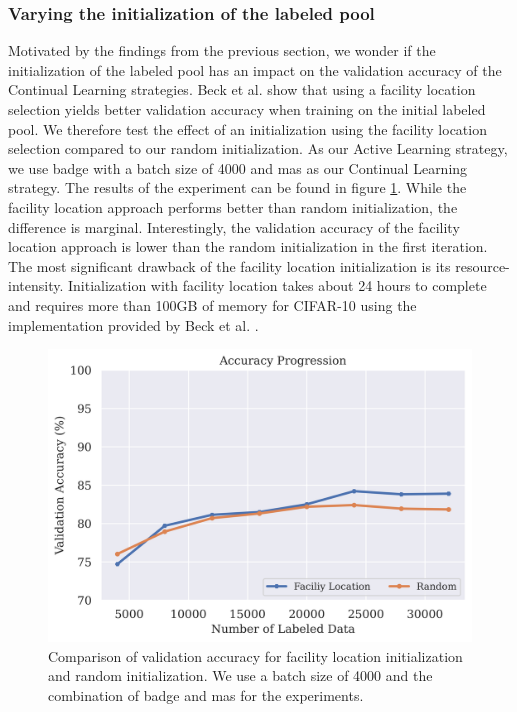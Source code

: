 \subsubsection{Varying the initialization of the labeled pool}
\label{sec:Evaluation:Results:CAL:Initialization}
Motivated by the findings from the previous section, we wonder if the initialization of the labeled pool has an impact on the validation accuracy of the Continual Learning strategies. Beck et al.\cite{beck2021effective} show that using a facility location selection 
\cite{iyer2021submodular} yields better validation accuracy when training on the initial labeled pool. We therefore test the effect of an initialization using the facility location selection compared to our random initialization. As our Active Learning strategy,
we use \gls{badge} with a batch size of 4000 and \gls{mas} as our Continual Learning strategy. The results of the experiment can be found in figure \ref{fig:Evaluation:Results:CAL:FLinit}. While the facility location approach performs better than random initialization, the difference is
marginal. Interestingly, the validation accuracy of the facility location approach is lower than the random initialization in the first iteration. The most significant drawback of the facility location initialization is its resource-intensity. Initialization with facility
location takes about 24 hours to complete and requires more than 100GB of memory for CIFAR-10 using the implementation provided by Beck et al. \cite{beck2021effective}. \par

\begin{figure}[h]
    \centering
    \includegraphics[width=0.7\linewidth]{images/results_CAL/Facility_location_init.png}
    \caption[Initialization using Facility Location]{Comparison of validation accuracy for facility location initialization and random initialization. We use a batch size of 4000 and the combination of \gls{badge} and \gls{mas} for the experiments.}
    \label{fig:Evaluation:Results:CAL:FLinit}
\end{figure}



